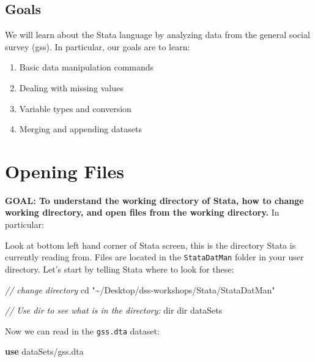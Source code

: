 \documentclass[
]{book}
\newenvironment{Shaded}{\begin{snugshade}}{\end{snugshade}}
\newcommand{\CommentTok}[1]{\textcolor[rgb]{0.56,0.35,0.01}{\textit{#1}}}
\newcommand{\KeywordTok}[1]{\textcolor[rgb]{0.13,0.29,0.53}{\textbf{#1}}}
\newcommand{\NormalTok}[1]{#1}
\newcommand{\OtherTok}[1]{\textcolor[rgb]{0.56,0.35,0.01}{#1}}
\newcommand{\StringTok}[1]{\textcolor[rgb]{0.31,0.60,0.02}{#1}}
\providecommand{\tightlist}{%
  \setlength{\itemsep}{0pt}\setlength{\parskip}{0pt}}
\begin{document}
\hypertarget{goals-6}{%
\subsection{Goals}\label{goals-6}}

We will learn about the Stata language by analyzing data from the general social survey (gss). In particular, our goals are to learn:

\begin{enumerate}
\def\labelenumi{\arabic{enumi}.}
\tightlist
\item
  Basic data manipulation commands
\item
  Dealing with missing values
\item
  Variable types and conversion
\item
  Merging and appending datasets
\end{enumerate}

\hypertarget{opening-files}{%
\section{Opening Files}\label{opening-files}}

\textbf{GOAL: To understand the working directory of Stata, how to change working directory, and open files from the working directory.} In particular:

Look at bottom left hand corner of Stata screen, this is the directory Stata is currently reading from. Files are located in the \texttt{StataDatMan} folder in your user directory. Let's start by telling Stata where to look for these:

\begin{Shaded}
\begin{Highlighting}[]
\CommentTok{// change directory}
\NormalTok{cd }\StringTok{"\textasciitilde{}/Desktop/dss{-}workshops/Stata/StataDatMan"}

\CommentTok{// Use dir to see what is in the directory:}
\OtherTok{dir}
\OtherTok{dir}\NormalTok{ dataSets}
\end{Highlighting}
\end{Shaded}

Now we can read in the \texttt{gss.dta} dataset:

\begin{Shaded}
\begin{Highlighting}[]
\KeywordTok{use}\NormalTok{ dataSets/gss.dta}
\end{Highlighting}
\end{Shaded}
\end{document}

